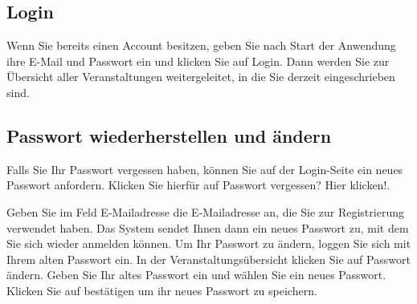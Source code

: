 \documentclass{Handbuch}
\begin{document}
\subsection{Login}
Wenn Sie bereits einen Account besitzen, geben Sie nach Start der Anwendung ihre E-Mail und Passwort ein und klicken Sie auf \frqq Login\flqq. Dann werden Sie zur Übersicht aller Veranstaltungen weitergeleitet, in die Sie derzeit eingeschrieben sind. 

\subsection{Passwort wiederherstellen und ändern}
\begin{center}
\end{center}
Falls Sie Ihr Passwort vergessen haben, können Sie auf der Login-Seite ein neues Passwort anfordern. Klicken Sie hierfür auf \frqq Passwort vergessen? Hier klicken!\flqq. 
\begin{center}
\end{center}
Geben Sie im Feld \glqq E-Mailadresse\grqq{} die E-Mailadresse an, die Sie zur Registrierung verwendet haben. Das System sendet Ihnen dann ein neues Passwort zu, mit dem Sie sich wieder anmelden können. 
Um Ihr Passwort zu ändern, loggen Sie sich mit Ihrem alten Passwort ein. In der Veranstaltungsübersicht klicken Sie auf \frqq Passwort ändern\flqq. Geben Sie Ihr altes Passwort ein und wählen Sie ein neues Passwort. Klicken Sie auf \frqq bestätigen\flqq{} um ihr neues Passwort zu speichern.
\end{document}
